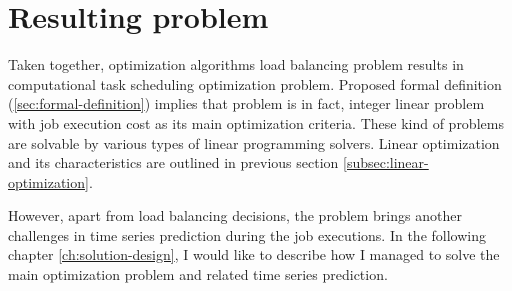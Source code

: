 \newpage
\section{Resulting problem}\label{sec:resulting-problem}
Taken together,
optimization algorithms load balancing problem results in computational task scheduling optimization problem.
Proposed formal definition (\ref{sec:formal-definition}) implies that problem is in fact, 
integer linear problem with job execution cost as its main optimization criteria. 
These kind of problems are solvable by various types of linear programming solvers.
Linear optimization and its characteristics are outlined in previous section \ref{subsec:linear-optimization}.

However,
apart from load balancing decisions,
the problem brings another challenges in time series prediction during the job executions.
In the following chapter \ref{ch:solution-design},
I would like to describe how I managed to solve the main optimization problem
and related time series prediction.